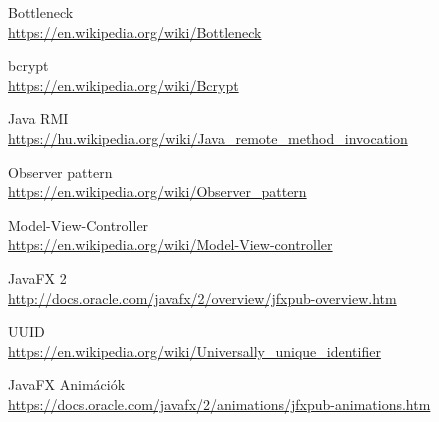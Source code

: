 \begin{thebibliography}{9}
Bottleneck \\
\url{https://en.wikipedia.org/wiki/Bottleneck}

bcrypt \\
\url{https://en.wikipedia.org/wiki/Bcrypt}

Java RMI \\
\url{https://hu.wikipedia.org/wiki/Java_remote_method_invocation}

Observer pattern \\
\url{https://en.wikipedia.org/wiki/Observer_pattern}

Model-View-Controller \\
\url{https://en.wikipedia.org/wiki/Model-View-controller}

JavaFX 2 \\
\url{http://docs.oracle.com/javafx/2/overview/jfxpub-overview.htm}

UUID \\
\url{https://en.wikipedia.org/wiki/Universally_unique_identifier}

JavaFX Animációk \\
\url{https://docs.oracle.com/javafx/2/animations/jfxpub-animations.htm}


\end{thebibliography}
